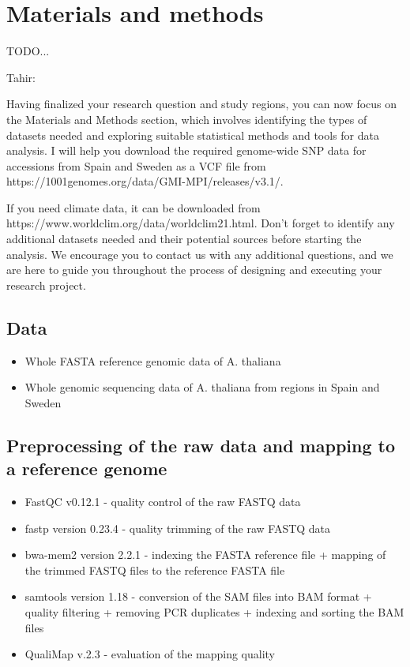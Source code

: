 \section{Materials and methods}

TODO...

Tahir:

Having finalized your research question and study regions, you can now focus on the Materials and Methods section, which involves identifying the types of datasets needed and exploring suitable statistical methods and tools for data analysis. I will help you download the required genome-wide SNP data for accessions from Spain and Sweden as a VCF file from https://1001genomes.org/data/GMI-MPI/releases/v3.1/.

If you need climate data, it can be downloaded from https://www.worldclim.org/data/worldclim21.html. Don’t forget to identify any additional datasets needed and their potential sources before starting the analysis. We encourage you to contact us with any additional questions, and we are here to guide you throughout the process of designing and executing your research project.

\subsection{Data}

\begin{itemize}
    \item Whole FASTA reference genomic data of A. thaliana
    \item Whole genomic sequencing data of A. thaliana from regions in Spain and Sweden
\end{itemize}

\subsection{Preprocessing of the raw data and mapping to a reference genome}

\begin{itemize}
    \item FastQC v0.12.1 - quality control of the raw FASTQ data
    \item fastp version 0.23.4 - quality trimming of the raw FASTQ data
    \item bwa-mem2 version 2.2.1 - indexing the FASTA reference file + mapping of the trimmed FASTQ files to the reference FASTA file
    \item samtools version 1.18 - conversion of the SAM files into BAM format + quality filtering + removing PCR duplicates + indexing and sorting the BAM files
    \item QualiMap v.2.3 - evaluation of the mapping quality
\end{itemize}

